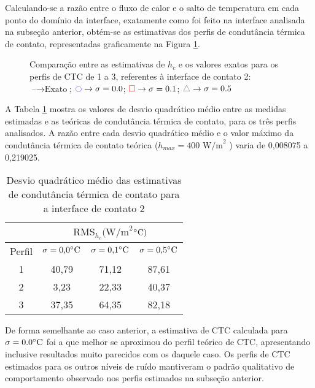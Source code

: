Calculando-se a razão entre o fluxo de calor e o salto de temperatura em cada ponto do domínio da interface, exatamente como foi feito na interface analisada na subseção anterior, obtém-se as estimativas dos perfis de condutância térmica de contato, representadas graficamente na Figura \ref{figura_ctc_interface_02}.
\begin{figure}[H]
	\caption{Comparação entre as estimativas de $h_c$ e os valores exatos para os perfis de CTC de 1 a 3, referentes à interface de contato 2: $\text{--} \rightarrow \text{Exato}$; $\textcolor{blue}{\ocircle} \rightarrow \sigma = 0.0$; $\textcolor{red}{\square} \rightarrow \sigma = 0.1$; $\textcolor{gray}{\triangle} \rightarrow \sigma = 0.5$}
	\label{figura_ctc_interface_02}
\end{figure}

A Tabela \ref{tabela_rms_ctc_interface_2} mostra os valores de desvio quadrático médio entre as medidas estimadas e as teóricas de condutância térmica de contato, para os três perfis analisados. A razão entre cada desvio quadrático médio e o valor máximo da condutância térmica de contato teórica ($h_{max} = 400 \text{ W/m}^2$ \celsius) varia de 0,008075 a 0,219025.
\begin{table}[H]
	\centering
	\caption{Desvio quadrático médio das estimativas de condutância térmica de contato para a interface de contato 2}
	\begin{tabular}{c|c|c|c|}
		\cline{2-4}
		& \multicolumn{3}{c|}{$\text{RMS}_{h_c}(\text{W/m}^{2}$$\celsius)$} \\ \hline
		\multicolumn{1}{|c|}{Perfil} & $\sigma = \text{0,0}\celsius$   & $\sigma = \text{0,1}\celsius$    & $\sigma = \text{0,5}\celsius$  \\ \hline
		\multicolumn{1}{|c|}{1}      & 40,79       &  71,12      & 87,61      \\ \hline
		\multicolumn{1}{|c|}{2}      & 3,23       & 22,33       &  40,37     \\ \hline
		\multicolumn{1}{|c|}{3}      & 37,35       & 64,35       & 82,18      \\ \hline
	\end{tabular}
	\label{tabela_rms_ctc_interface_2}
\end{table}

De forma semelhante ao caso anterior, a estimativa de CTC calculada para $\sigma = 0.0\celsius$ foi a que melhor se aproximou do perfil teórico de CTC, apresentando inclusive resultados muito parecidos com os daquele caso. Os perfis de CTC estimados para os outros níveis de ruído mantiveram o padrão qualitativo de comportamento observado nos perfis estimados na subseção anterior.
